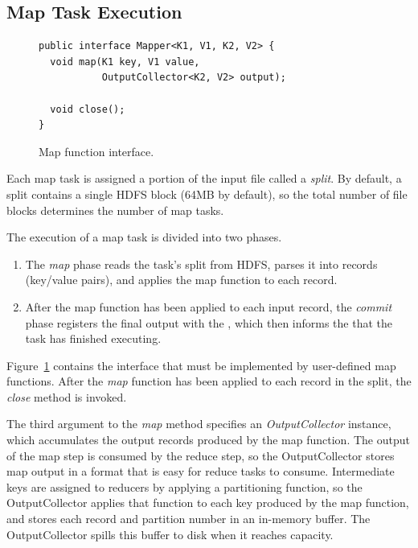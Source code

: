 \subsection{Map Task Execution}
\label{sec:maptask}
\begin{figure}[t]
\begin{minipage}{\linewidth}
\begin{small}
\begin{verbatim}
public interface Mapper<K1, V1, K2, V2> {
  void map(K1 key, V1 value,
           OutputCollector<K2, V2> output);

  void close();
}
\end{verbatim}
\end{small}
\end{minipage}
\vspace{-4pt}
\caption{Map function interface.}
\label{fig:mapfunction}
\end{figure}

Each map task is assigned a portion of the input file called a \emph{split}. By
default, a split contains a single HDFS block (64MB by default), so the total
number of file blocks determines the number of map tasks.

The execution of a map task is divided into two phases.
\begin{enumerate}
\item
  The \emph{map} phase reads the task's split from HDFS, parses it into
  records (key/value pairs), and applies the map function to each
  record.
\item
  After the map function has been applied to each input record, the
  \emph{commit} phase registers the final output with the {\TT}, which
  then informs the {\JT} that the task has finished executing.
\end{enumerate}

Figure~\ref{fig:mapfunction} contains the interface that must be
implemented by user-defined map functions. After the \emph{map}
function has been applied to each record in the split, the
\emph{close} method is invoked.

The third argument to the \emph{map} method specifies an \emph{OutputCollector}
instance, which accumulates the output records produced by the map function. The
output of the map step is consumed by the reduce step, so the OutputCollector
stores map output in a format that is easy for reduce tasks to
consume. Intermediate keys are assigned to reducers by applying a partitioning
function, so the OutputCollector applies that function to each key produced by
the map function, and stores each record and partition number in an in-memory
buffer. The OutputCollector spills this buffer to disk when it reaches capacity.

